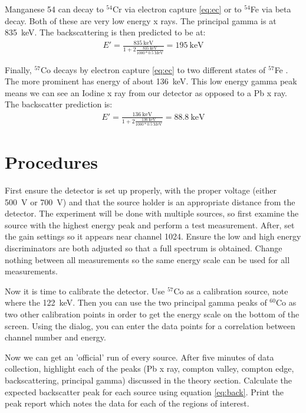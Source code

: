 \documentclass[letterpaper,12pt]{article}
\begin{document}
Manganese 54 can decay to $^{54}$Cr via electron capture \eqref{eq:ec} or to $^{54}$Fe via beta decay\cite{TabRad_v5}. Both of these are very low energy x rays. The principal gamma is at \SI{835}{\keV}. The backscattering is then predicted to be at:
\begin{align*}
  E'=\frac{\SI{835}{\keV}}
  {1+2\frac{\SI{835}{\keV}}{1000*\SI{0.5}{\MeV}}}
  =\boxed{\SI{195}{\keV}}
\end{align*}

Finally, $^{57}$Co decays by electron capture \eqref{eq:ec} to two different states of $^{57}$Fe \cite{TabRad_v5}. The more prominent has energy of about \SI{136}{\keV}. This low energy gamma peak means we can see an Iodine x ray from our detector as opposed to a Pb x ray. The backscatter prediction is:
\begin{align*}
  E'=\frac{\SI{136}{\keV}}
  {1+2\frac{\SI{136}{\keV}}{1000*\SI{0.5}{\MeV}}}
  =\boxed{\SI{88.8}{\keV}}
\end{align*}
\section{Procedures}
First ensure the detector is set up properly, with the proper voltage (either \SI{500}{\V} or \SI{700}{\V}) and that the source holder is an appropriate distance from the detector. The experiment will be done with multiple sources, so first examine the source with the highest energy peak and perform a test measurement. After, set the gain settings so it appears near channel 1024. Ensure the low and high energy discriminators are both adjusted so that a full spectrum is obtained. Change nothing between all measurements so the same energy scale can be used for all measurements.

Now it is time to calibrate the detector. Use $^{57}$Co as a calibration source, note where the \SI{122}{\kilo\eV}. Then you can use the two principal gamma peaks of $^{60}$Co as two other calibration points in order to get the energy scale on the bottom of the screen. Using the dialog, you can enter the data points for a correlation between channel number and energy.

Now we can get an 'official' run of every source. After five minutes of data collection, highlight each of the peaks (Pb x ray, compton valley, compton edge, backscattering, principal gamma) discussed in the theory section. Calculate the expected backscatter peak for each source using equation \eqref{eq:back}. Print the peak report which notes the data for each of the regions of interest.
\end{document}
